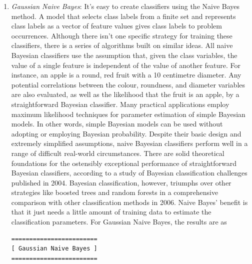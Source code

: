 \documentclass[sn-basic]{sn-jnl}%
\theoremstyle{thmstyleone}%
\theoremstyle{thmstyletwo}%
\theoremstyle{thmstylethree}%
\begin{document}
\begin{enumerate}
\begin{figure}[!h]
{or attributes are absent) is 53, and True Negative (An accurate test result that shows the absence of a condition or trait) is 79.}
\label{Fig. 7}
\end{figure}
\item \textit{Gaussian Naive Bayes}: It's easy to create classifiers using the Naive Bayes method. A model that selects class labels from a finite set and represents class labels as a vector of feature values gives class labels to problem occurrences. Although there isn't one specific strategy for training these classifiers, there is a series of algorithms built on similar ideas. All naive Bayesian classifiers use the assumption that, given the class variables, the value of a single feature is independent of the value of another feature. For instance, an apple is a round, red fruit with a 10 centimetre diameter. Any potential correlations between the colour, roundness, and diameter variables are also evaluated, as well as the likelihood that the fruit is an apple, by a straightforward Bayesian classifier. Many practical applications employ maximum likelihood techniques for parameter estimation of simple Bayesian models. In other words, simple Bayesian models can be used without adopting or employing Bayesian probability. Despite their basic design and extremely simplified assumptions, naive Bayesian classifiers perform well in a range of difficult real-world circumstances. There are solid theoretical foundations for the ostensibly exceptional performance of straightforward Bayesian classifiers, according to a study of Bayesian classification challenges published in 2004. Bayesian classification, however, triumphs over other strategies like boosted trees and random forests in a comprehensive comparison with other classification methods in 2006. Naive Bayes' benefit is that it just needs a little amount of training data to estimate the classification parameters. For Gaussian Naive Bayes, the results are as
\begin{verbatim}
========================
[ Gaussian Naive Bayes ]
========================


\end{verbatim}
\end{enumerate}
\end{document}
